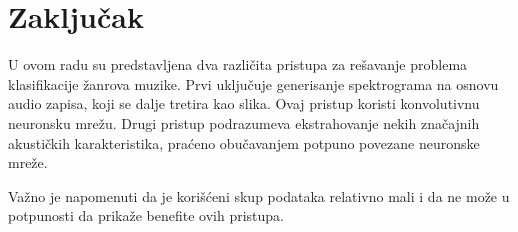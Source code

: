 \documentclass{article}
\begin{document}
\section{Zaključak}

U ovom radu su predstavljena dva različita pristupa za rešavanje problema klasifikacije žanrova muzike. Prvi uključuje generisanje spektrograma na osnovu audio zapisa, koji se dalje tretira kao slika. Ovaj pristup koristi konvolutivnu neuronsku mrežu. Drugi pristup podrazumeva ekstrahovanje nekih značajnih akustičkih karakteristika, praćeno obučavanjem potpuno povezane neuronske mreže.

Važno je napomenuti da je korišćeni skup podataka relativno mali i da ne može u potpunosti da prikaže benefite ovih pristupa.
\end{document}
